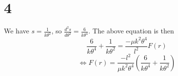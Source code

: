 \documentclass{article}
\begin{document}
\section*{4}
We have $s=\frac{1}{k\theta^2}$, so $\frac{d^2s}{d\theta^2}=\frac{6}{k\theta^4}$. The above equation is then
\[\frac{6}{k\theta^4}+\frac{1}{k\theta^2}=\frac{-\mu k^2\theta^4}{l^2}F(r)\]
\[\Leftrightarrow F(r)=\frac{-l^2}{\mu k^2\theta^4}\left(\frac{6}{k\theta^4}+\frac{1}{k\theta^2}\right)\]
\end{document}
